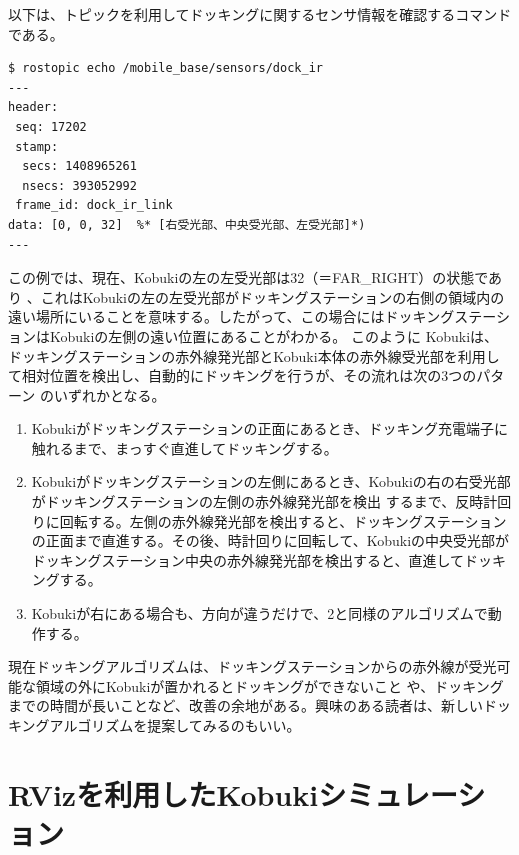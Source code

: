 \begin{itemize}
以下は、トピックを利用してドッキングに関するセンサ情報を確認するコマンドである。

\begin{lstlisting}[language=ROS]
$ rostopic echo /mobile_base/sensors/dock_ir
---
header:
 seq: 17202
 stamp:
  secs: 1408965261
  nsecs: 393052992
 frame_id: dock_ir_link
data: [0, 0, 32]  %* [右受光部、中央受光部、左受光部]*)
---
\end{lstlisting}

この例では、現在、Kobukiの左の左受光部は32（＝FAR\_RIGHT）の状態であり  、これはKobukiの左の左受光部がドッキングステーションの右側の領域内の遠い場所にいることを意味する。したがって、この場合にはドッキングステーションはKobukiの左側の遠い位置にあることがわかる。
このように  Kobukiは、ドッキングステーションの赤外線発光部とKobuki本体の赤外線受光部を利用して相対位置を検出し、自動的にドッキングを行うが、その流れは次の3つのパターン   のいずれかとなる。

\begin{enumerate}[leftmargin=*]
\item Kobukiがドッキングステーションの正面にあるとき、ドッキング充電端子に触れるまで、まっすぐ直進してドッキングする。

\item Kobukiがドッキングステーションの左側にあるとき、Kobukiの右の右受光部がドッキングステーションの左側の赤外線発光部を検出  するまで、反時計回りに回転する。左側の赤外線発光部を検出すると、ドッキングステーションの正面まで直進する。その後、時計回りに回転して、Kobukiの中央受光部がドッキングステーション中央の赤外線発光部を検出すると、直進してドッキングする。

\item Kobukiが右にある場合も、方向が違うだけで、2と同様のアルゴリズムで動作する。
\end{enumerate}

現在ドッキングアルゴリズムは、ドッキングステーションからの赤外線が受光可能な領域の外にKobukiが置かれるとドッキングができないこと   や、ドッキングまでの時間が長いことなど、改善の余地がある。興味のある読者は、新しいドッキングアルゴリズムを提案してみるのもいい。

\section{RVizを利用したKobukiシミュレーション}


\end{itemize}
